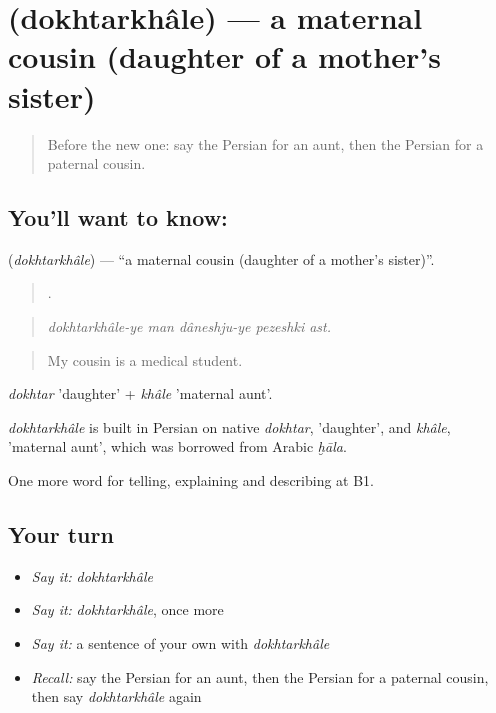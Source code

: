\section[\texorpdfstring{\fa{دخترخاله} (dokhtarkhâle)}{دخترخاله (dokhtarkhâle)}]{ (dokhtarkhâle) — a maternal cousin (daughter of a mother's sister)}

\label{lesson:FA-C500-dokhtarkhale}



\begin{quote}
Before the new one: say the Persian for an aunt, then the Persian for a paternal cousin.
\end{quote}

\subsection*{You'll want to know: }
\textbf{} (\emph{dokhtarkhâle}) — \textquotedblleft{}a maternal cousin (daughter of a mother's sister)\textquotedblright{}.

\begin{quote}
    .
\end{quote}

\begin{quote}
\emph{dokhtarkhâle-ye man dâneshju-ye pezeshki ast.}
\end{quote}

\begin{quote}
My cousin is a medical student.
\end{quote}

\emph{dokhtar} 'daughter' + \emph{khâle} 'maternal aunt'.

\begin{cousinweb}
\emph{dokhtarkhâle} is built in Persian on native \emph{dokhtar}, 'daughter', and \emph{khâle}, 'maternal aunt', which was borrowed from Arabic \emph{ḫāla}.
\end{cousinweb}

\begin{grammarlens}[title={What you've built}]
One more word for telling, explaining and describing at B1.
\end{grammarlens}

\subsection*{Your turn}
\begin{itemize}
\raggedright
  \item \emph{Say it:} \emph{dokhtarkhâle}
  \item \emph{Say it:} \emph{dokhtarkhâle}, once more
  \item \emph{Say it:} a sentence of your own with \emph{dokhtarkhâle}
  \item \emph{Recall:} say the Persian for an aunt, then the Persian for a paternal cousin, then say \emph{dokhtarkhâle} again
\end{itemize}

